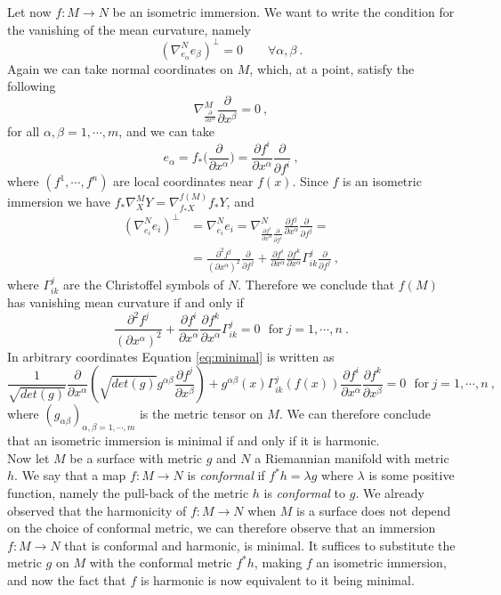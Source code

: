 Let now $f:M \to N$ be an isometric immersion. We want to write the condition for the vanishing of the mean curvature, namely
\[
    (\nabla^N_{e_\alpha} e_\beta)^\perp = 0 \qquad \forall \alpha, \beta \ .
\]
Again we can take normal coordinates on $M$, which, at a point, satisfy the following
\[
    \nabla^M_{\frac{\partial}{\partial x^\alpha}}  \frac{\partial}{\partial x^\beta} = 0 \ ,
\]
for all $\alpha, \beta = 1, \cdots, m$, and we can take
\[
    e_\alpha = f_*\Big( \frac{\partial}{\partial x^\alpha} \Big) = \frac{\partial f^i}{\partial x^\alpha} \frac{\partial}{\partial f^i} \ ,
\]
where $(f^1, \cdots, f^n)$ are local coordinates near $f(x)$.
Since $f$ is an isometric immersion we have $f_* \nabla^M_X Y = \nabla^{f(M)}_{f_* X} f_* Y$, and
\[
\begin{split}
    (\nabla^N_{e_i} e_i)^\perp & = \nabla^N_{e_i} e_i = \nabla^N_{\frac{\partial f^i}{\partial x^\alpha} \frac{\partial}{\partial f^i}}  \frac{\partial f^j}{\partial x^\alpha} \frac{\partial}{\partial f^j} = \\
    & = \frac{\partial^2 f^j}{(\partial x^\alpha)^2} \frac{\partial}{\partial f^j} + \frac{\partial f^i}{\partial x^\alpha} \frac{\partial f^k}{\partial x^\alpha} \Gamma^j_{ik} \frac{\partial}{\partial f^j} \ ,
\end{split}
\]
where $\Gamma^j_{ik}$ are the Christoffel symbols of $N$. Therefore we conclude that $f(M)$ has vanishing mean curvature if and only if
\begin{equation}\label{eq:minimal}
    \frac{\partial^2 f^j}{(\partial x^\alpha)^2} + \frac{\partial f^i}{\partial x^\alpha} \frac{\partial f^k}{\partial x^\alpha} \Gamma^j_{ik}  = 0 \ \ \ \text{for} \ j=1, \cdots, n \ .
\end{equation}
In arbitrary coordinates Equation \ref{eq:minimal} is written as
\[
    \frac{1}{\sqrt{det(g)}} \frac{\partial}{\partial x^\alpha}(\sqrt{det(g)} g^{\alpha\beta} \frac{\partial f^j}{\partial x^\beta}) + g^{\alpha\beta}(x) \Gamma^j_{ik}(f(x)) \frac{\partial f^i}{\partial x^\alpha}  \frac{\partial f^k}{\partial x^\beta} = 0  \ \ \ \text{for} \ j=1, \cdots, n \ ,
\]
where $(g_{\alpha \beta})_{\alpha,\beta = 1,\cdots,m}$ is the metric tensor on $M$.
We can therefore conclude that an isometric immersion is minimal if and only if it is harmonic.\\
Now let $M$ be a surface with metric $g$ and $N$ a Riemannian manifold with metric $h$. We say that a map $f:M \to N$ is \textit{conformal} if $f^* h = \lambda g$ where $\lambda$ is some positive function, namely the pull-back of the metric $h$ is \textit{conformal} to $g$. We already observed that the harmonicity of $f:M \to N$ when $M$ is a surface does not depend on the choice of conformal metric, we can therefore observe that an immersion $f:M \to N$ that is conformal and harmonic, is minimal. It suffices to substitute the metric $g$ on $M$ with the conformal metric $f^* h$, making $f$ an isometric immersion, and now the fact that $f$ is harmonic is now equivalent to it being minimal.\\
